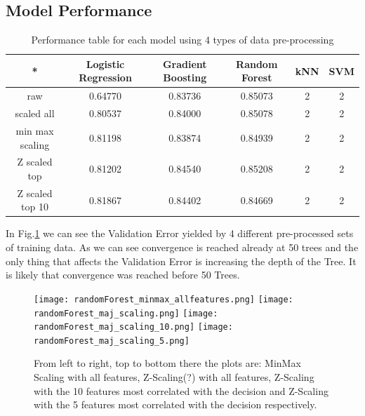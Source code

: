 \documentclass{article}
\begin{document}
    \subsection{Model Performance}
    


    
    
    
    
    
    \begin{table}[]
        \centering
        \begin{tabular}{c | c | c | c | c | c }
        \hline
          * &  Logistic Regression & Gradient Boosting & Random Forest & kNN  & SVM & \\
        \hline   
           raw  & 0.64770 & 0.83736 & 0.85073 & 2 & 2  \\
         \hline
           scaled all & 0.80537 & 0.84000 & 0.85078 & 2  & 2 \\
            
            min max scaling & 0.81198 & 0.83874 & 0.84939 & 2 & 2 \\
        
           Z scaled top & 0.81202 & 0.84540 & 0.85208 & 2& 2  \\
           
           Z scaled top 10 & 0.81867 & 0.84402 & 0.84669 & 2& 2 \\
        
        \end{tabular}
        \caption{Performance table for each model using 4 types of data pre-processing}
        \label{tab:my_label}
    \end{table}
    
    In Fig.\ref{fig:randfor} we can see the Validation Error yielded by 4 different pre-processed sets of training data. As we can see convergence is reached already at 50 trees and the only thing that affects the Validation Error is increasing the depth of the Tree. It is likely that convergence was reached before 50 Trees. 
    
    \begin{figure}[ht!]
        \texttt{[image: randomForest\_minmax\_allfeatures.png]}\hfill
        \texttt{[image: randomForest\_maj\_scaling.png]}\hfill
        \texttt{[image: randomForest\_maj\_scaling\_10.png]}\hfill
        \texttt{[image: randomForest\_maj\_scaling\_5.png]}\hfill

        \caption{From left to right, top to bottom there the plots are: MinMax Scaling with all features, Z-Scaling(?) with all features, Z-Scaling with the 10 features most correlated with the decision and Z-Scaling with the 5 features most correlated with the decision respectively.} 
            \label{fig:randfor}
    \end{figure}
        
\end{document}
